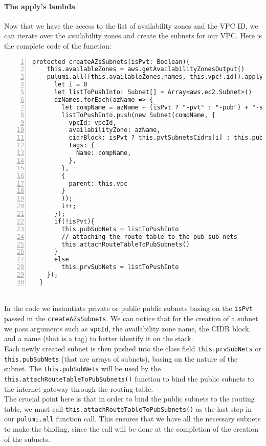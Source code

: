 \paragraph{The apply's lambda}
\label{par:ts-lambda}
Now that we have the access to the list of availability zones and the VPC ID, we can iterate over the availability zones and create the subnets for our VPC.
Here is the complete code of the function:
\begin{lstlisting}[numbers=left, numberstyle=\tiny, numbersep=-5pt, stepnumber=1]
  protected createAZsSubnets(isPvt: Boolean){
    this.availableZones = aws.getAvailabilityZonesOutput()
    pulumi.all([this.availableZones.names, this.vpc!.id]).apply(([azNames, vpcId]) => {
      let i = 0
      let listToPushInto: Subnet[] = Array<aws.ec2.Subnet>()
      azNames.forEach(azName => {
        let compName = azName + (isPvt ? "-pvt" : "-pub") + "-subnet-typescript"
        listToPushInto.push(new Subnet(compName, {
          vpcId: vpcId,
          availabilityZone: azName,
          cidrBlock: isPvt ? this.pvtSubnetsCidrs[i] : this.pubSubnetsCidrs[i],
          tags: {
            Name: compName,
          },
        },
        {
          parent: this.vpc
        }
        ));
        i++;
      });
      if(!isPvt){
        this.pubSubNets = listToPushInto
        // attaching the route table to the pub sub nets
        this.attachRouteTableToPubSubnets()
      }
      else
        this.prvSubNets = listToPushInto
    });
  }
\end{lstlisting}\mbox{}\\
In the code we instantiate private or public public subnets basing on the \texttt{isPvt} passed in the \texttt{createAZsSubnets}.
We can notice that for the creation of a subnet we pass arguments such as \texttt{vpcId}, the availability zone name, the CIDR block, and a name (that is a tag) to better identify it on the stack.\\
Each newly created subnet is then pushed into the class field \texttt{this.prvSubNets} or \texttt{this.pubSubNets} (that are arrays of subnets), basing on the nature of the subnet.
The \texttt{this.pubSubNets} will be used by the \texttt{this.attachRouteTableToPubSubnets()} function to bind the public subnets to the internet gateway through the routing table.\\
The crucial point here is that in order to bind the public subnets to the routing table, we must call \texttt{this.attachRouteTableToPubSubnets()} as the last step in our \texttt{pulumi.all} function call.
This ensures that we have all the necessary subnets to make the binding, since the call will be done at the completion of the creation of the subnets.

